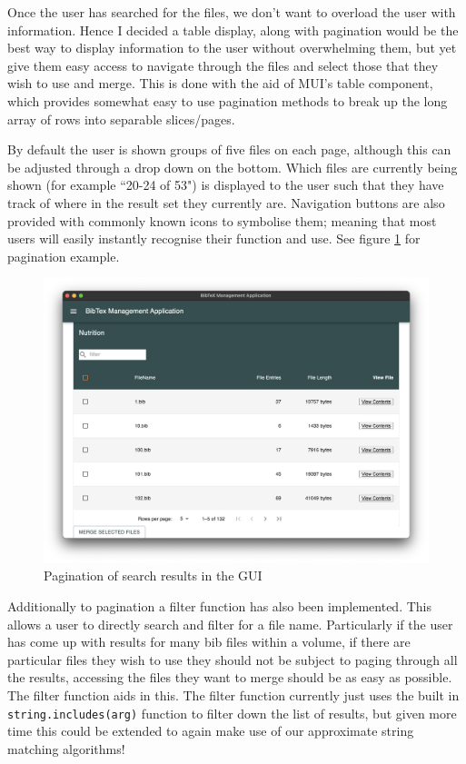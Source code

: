 \documentclass[a4paper,11pt]{article}
\newcommand{\code}[1]{\colorbox{codegray}{\texttt{#1}}}
\begin{document}
Once the user has searched for the files, we don't want to overload the user with information. Hence I decided a table display, along with pagination would be the best way to display information to the user without overwhelming them, but yet give them easy access to navigate through the files and select those that they wish to use and merge. This is done with the aid of MUI's \cite{mui} table component, which provides somewhat easy to use pagination methods to break up the long array of rows into separable slices/pages.

By default the user is shown groups of five files on each page, although this can be adjusted through a drop down on the bottom. Which files are currently being shown (for example ``20-24 of 53") is displayed to the user such that they have track of where in the result set they currently are. Navigation buttons are also provided with commonly known icons to symbolise them; meaning that most users will easily instantly recognise their function and use. See figure \ref{fig:pagination} for pagination example.

\begin{figure}
    \centering
    \includegraphics[width=0.8\linewidth]{images/pagination.png}
    \caption{Pagination of search results in the GUI}
    \label{fig:pagination}
\end{figure}

Additionally to pagination a filter function has also been implemented. This allows a user to directly search and filter for a file name. Particularly if the user has come up with results for many bib files within a volume, if there are particular files they wish to use they should not be subject to paging through all the results, accessing the files they want to merge should be as easy as possible. The filter function aids in this. The filter function currently just uses the built in \code{string.includes(arg)} function to filter down the list of results, but given more time this could be extended to again make use of our approximate string matching algorithms!
\end{document}
